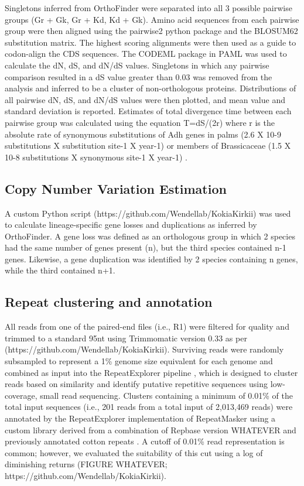 \documentclass[10pt,letterpaper]{article}
\begin{document}
Singletons inferred from OrthoFinder were separated into all 3 possible pairwise
groups (Gr + Gk, Gr + Kd, Kd + Gk). Amino acid sequences from each pairwise
group were then aligned using the pairwise2 python package and the BLOSUM62
substitution matrix. The highest scoring alignments were then used as a guide to
codon-align the CDS sequences. The CODEML package in PAML \cite{Yang2007} was
used to calculate the dN, dS, and dN/dS values. Singletons in which any pairwise
comparison resulted in a dS value greater than 0.03 was removed from the
analysis and inferred to be a cluster of non-orthologous proteins. Distributions
of all pairwise dN, dS, and dN/dS values were then plotted, and mean value and
standard deviation is reported. Estimates of total divergence time between each
pairwise group was calculated using the equation T=dS/(2r) where r is the
absolute rate of synonymous substitutions of Adh genes in palms (2.6 X 10-9
substitutions X substitution site-1 X year-1) \cite{Cronn2002} \cite{Morton1996}
or members of Brassicaceae (1.5 X 10-8 substitutions X synonymous site-1 X
year-1) \cite{Koch2000}.


\subsection*{Copy Number Variation Estimation}
A custom Python script (https://github.com/Wendellab/KokiaKirkii) was used to
calculate lineage-specific gene losses and duplications as inferred by
OrthoFinder. A gene loss was defined as an orthologous group in which 2 species
had the same number of genes present (n), but the third species contained n-1
genes. Likewise, a gene duplication was identified by 2 species containing n
genes, while the third contained n+1.


\subsection*{Repeat clustering and annotation}
All reads from one of the paired-end files (i.e., R1) were filtered for quality
and trimmed to a standard 95nt using Trimmomatic version 0.33 \cite{Bolger2014}
as per (https://github.com/Wendellab/KokiaKirkii). Surviving reads were randomly
subsampled to represent a 1\% genome size equivalent for each genome
\cite{Hendrix2005} \cite{Wendel2002} and combined as input into the
RepeatExplorer pipeline \cite{Novak2013} \cite{Novak2010}, which is designed to
cluster reads based on similarity and identify putative repetitive sequences
using low-coverage, small read sequencing. Clusters containing a minimum of
0.01\% of the total input sequences (i.e., 201 reads from a total input of
2,013,469 reads) were annotated by the RepeatExplorer implementation of
RepeatMasker \cite{Smit2015} using a custom library derived from a combination
of Repbase version WHATEVER \cite{Bao2015} and previously annotated cotton
repeats \cite{Paterson2012} \cite{Grover2008} \cite{Grover2007}
\cite{Grover2004} \cite{Hawkins2006}. A cutoff of 0.01\% read representation is
common; however, we evaluated the suitability of this cut using a log of
diminishing returns (FIGURE WHATEVER; https://github.com/Wendellab/KokiaKirkii).
\end{document}
